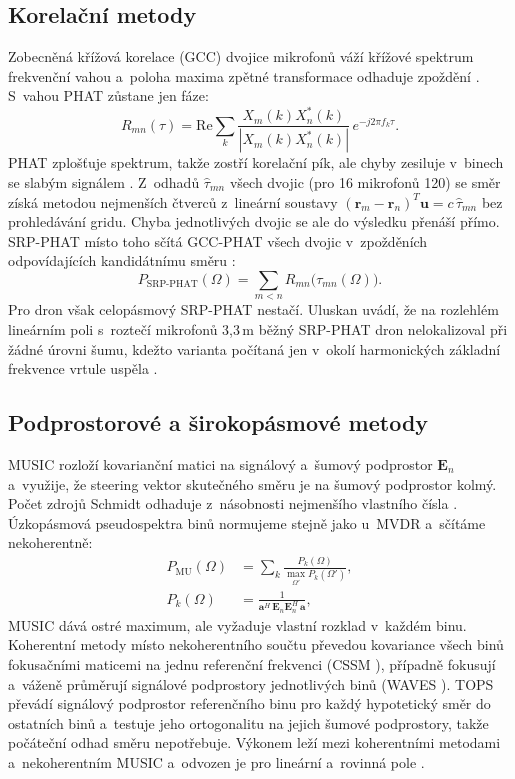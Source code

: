 \documentclass[conference]{IEEEtran}
\begin{document}
\subsection{Korelační metody}
Zobecněná křížová korelace (GCC) dvojice mikrofonů váží křížové spektrum frekvenční vahou a~poloha maxima zpětné transformace odhaduje zpoždění \cite{knapp1976gcc}. S~vahou PHAT zůstane jen fáze:
\begin{equation}
  R_{mn}(\tau) = \mathrm{Re}\sum_k \frac{X_m(k)X_n^*(k)}{|X_m(k)X_n^*(k)|}\,e^{-j2\pi f_k\tau}.
  \label{eq:gcc}
\end{equation}
PHAT zplošťuje spektrum, takže zostří korelační pík, ale chyby zesiluje v~binech se slabým signálem \cite{knapp1976gcc}. Z~odhadů $\hat\tau_{mn}$ všech dvojic (pro 16 mikrofonů 120) se směr získá metodou nejmenších čtverců z~lineární soustavy $(\mathbf{r}_m-\mathbf{r}_n)^T\mathbf{u}=c\,\hat\tau_{mn}$ bez prohledávání gridu. Chyba jednotlivých dvojic se ale do výsledku přenáší přímo. SRP-PHAT místo toho sčítá GCC-PHAT všech dvojic v~zpožděních odpovídajících kandidátnímu směru \cite{dibiase2001srpphat}:
\begin{equation}
  P_{\mathrm{SRP\text{-}PHAT}}(\Omega) = \sum_{m<n} R_{mn}\big(\tau_{mn}(\Omega)\big).
  \label{eq:srpphat}
\end{equation}
Pro dron však celopásmový SRP-PHAT nestačí. Uluskan uvádí, že na rozlehlém lineárním poli s~roztečí mikrofonů 3{,}3\,m běžný SRP-PHAT dron nelokalizoval při žádné úrovni šumu, kdežto varianta počítaná jen v~okolí harmonických základní frekvence vrtule uspěla \cite{uluskan2024srpphat}.

\subsection{Podprostorové a širokopásmové metody}
MUSIC rozloží kovarianční matici na signálový a~šumový podprostor $\mathbf{E}_n$ a~využije, že steering vektor skutečného směru je na šumový podprostor kolmý. Počet zdrojů Schmidt odhaduje z~násobnosti nejmenšího vlastního čísla \cite{schmidt1986music}. Úzkopásmová pseudospektra binů normujeme stejně jako u~MVDR a~sčítáme nekoherentně:
\begin{equation}
  \begin{split}
    P_{\mathrm{MU}}(\Omega) &= \sum_k \frac{P_k(\Omega)}{\max_{\Omega'} P_k(\Omega')}, \\
    P_k(\Omega) &= \frac{1}{\mathbf{a}^H\,\mathbf{E}_n\mathbf{E}_n^H\,\mathbf{a}},
  \end{split}
  \label{eq:music}
\end{equation}
MUSIC dává ostré maximum, ale vyžaduje vlastní rozklad v~každém binu. Koherentní metody místo nekoherentního součtu převedou kovariance všech binů fokusačními maticemi na jednu referenční frekvenci (CSSM \cite{wang1985cssm}), případně fokusují a~váženě průměrují signálové podprostory jednotlivých binů (WAVES \cite{diclaudio2001waves}). TOPS převádí signálový podprostor referenčního binu pro každý hypotetický směr do ostatních binů a~testuje jeho ortogonalitu na jejich šumové podprostory, takže počáteční odhad směru nepotřebuje. Výkonem leží mezi koherentními metodami a~nekoherentním MUSIC a~odvozen je pro lineární a~rovinná pole \cite{yoon2006tops}.
\end{document}
